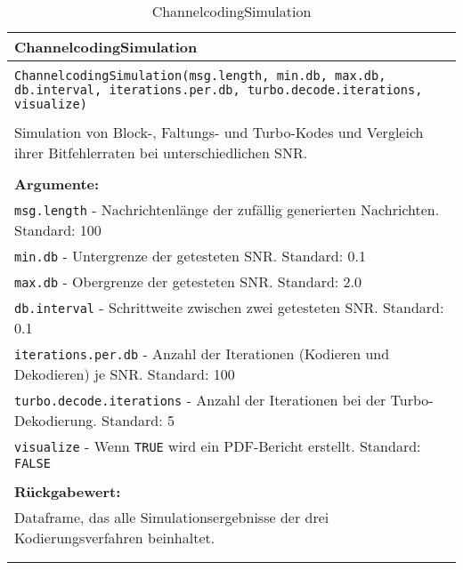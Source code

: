 \begin{longtable}{|p{\textwidth}|}
\hline
\rowcolor{lightblue}
ChannelcodingSimulation
\\
\hline
\\
\texttt{ChannelcodingSimulation(msg.length, min.db, max.db, db.interval, iterations.per.db, turbo.decode.iterations, visualize)}\\
\\
Simulation von Block-, Faltungs- und Turbo-Kodes und Vergleich ihrer Bitfehlerraten bei unterschiedlichen SNR.\\
\\
\textbf{Argumente:}\\
\texttt{msg.length} - Nachrichtenlänge der zufällig generierten Nachrichten. Standard: 100\\
\texttt{min.db} - Untergrenze der getesteten SNR. Standard: 0.1\\
\texttt{max.db} - Obergrenze der getesteten SNR. Standard: 2.0\\
\texttt{db.interval} - Schrittweite zwischen zwei getesteten SNR. Standard: 0.1\\
\texttt{iterations.per.db} - Anzahl der Iterationen (Kodieren und Dekodieren) je SNR. Standard: 100\\
\texttt{turbo.decode.iterations} - Anzahl der Iterationen bei der Turbo-Dekodierung. Standard: 5\\
\texttt{visualize} - Wenn \texttt{TRUE} wird ein PDF-Bericht erstellt. Standard: \texttt{FALSE}\\
\\
\textbf{Rückgabewert:}\\
Dataframe, das alle Simulationsergebnisse der drei Kodierungsverfahren beinhaltet.\\
\\
\hline
\caption{ChannelcodingSimulation}
\label{funktion:ChannelcodingSimulation}
\end{longtable}